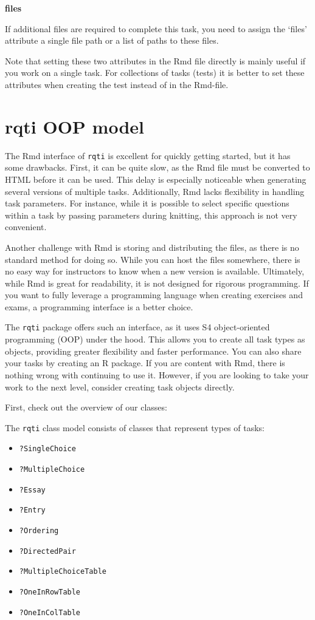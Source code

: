 \documentclass[twoside]{tufte-book}
\providecommand{\tightlist}{%
  \setlength{\itemsep}{0pt}\setlength{\parskip}{0pt}}
\begin{document}
\noindent\textbf{files}\label{files-1}

If additional files are required to complete this task, you need to assign the `files' attribute a single file path or a list of paths to these files.

Note that setting these two attributes in the Rmd file directly is mainly useful if you work on a single task. For collections of tasks (tests) it is better to set these attributes when creating the test instead of in the Rmd-file.

\chapter{rqti OOP model}\label{rqti-oop-model}

The Rmd interface of \texttt{rqti} is excellent for quickly getting started, but it has some drawbacks. First, it can be quite slow, as the Rmd file must be converted to HTML before it can be used. This delay is especially noticeable when generating several versions of multiple tasks. Additionally, Rmd lacks flexibility in handling task parameters. For instance, while it is possible to select specific questions within a task by passing parameters during knitting, this approach is not very convenient.

Another challenge with Rmd is storing and distributing the files, as there is no standard method for doing so. While you can host the files somewhere, there is no easy way for instructors to know when a new version is available. Ultimately, while Rmd is great for readability, it is not designed for rigorous programming. If you want to fully leverage a programming language when creating exercises and exams, a programming interface is a better choice.

The \texttt{rqti} package offers such an interface, as it uses S4 object-oriented programming (OOP) under the hood. This allows you to create all task types as objects, providing greater flexibility and faster performance. You can also share your tasks by creating an R package. If you are content with Rmd, there is nothing wrong with continuing to use it. However, if you are looking to take your work to the next level, consider creating task objects directly.

First, check out the overview of our classes:

The \texttt{rqti} class model consists of classes that represent types of tasks:

\begin{itemize}
\tightlist
\item
  \texttt{?SingleChoice}
\item
  \texttt{?MultipleChoice}
\item
  \texttt{?Essay}
\item
  \texttt{?Entry}
\item
  \texttt{?Ordering}
\item
  \texttt{?DirectedPair}
\item
  \texttt{?MultipleChoiceTable}
\item
  \texttt{?OneInRowTable}
\item
  \texttt{?OneInColTable}
\end{itemize}
\end{document}
